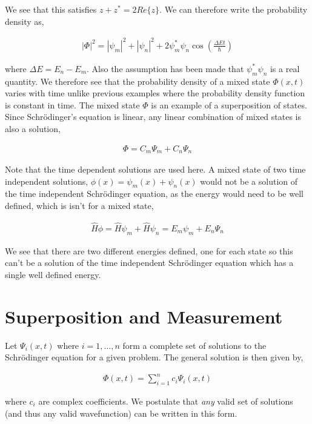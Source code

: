\documentclass[11pt]{amsart}
\begin{document}
We see that this satisfies $z + z^* = 2 Re\{z\}$. We can therefore write the probability density as,

\begin{align*}
  {|\Phi|}^2 = {|\psi_m|}^2 + {|\psi_n|}^2 + 2\psi_m^* \psi_n \cos{\left(\frac{\Delta E t}{\hbar}\right)}
\end{align*}

where $\Delta E = E_n - E_m$. Also the assumption has been made that $\psi_m^*\psi_n$ is a real quantity. We therefore see that the probability density of a mixed state $\Phi(x, t)$ varies with time unlike previous examples where the probability density function is constant in time. The mixed state $\Phi$ is an example of a superposition of states. Since Schr\"{o}dinger's equation is linear, any linear combination of mixed states is also a solution,

\begin{align*}
  \Phi = C_m \Psi_m + C_n \Psi_n
\end{align*}

Note that the time dependent solutions are used here. A mixed state of two time independent solutions, $\phi(x) = \psi_m(x) + \psi_n(x)$ would not be a solution of the time independent Schr\"{o}dinger equation, as the energy would need to be well defined, which is isn't for a mixed state,

\begin{align*}
  \hat{H}\phi = \hat{H}\psi_m + \hat{H}\psi_n = E_m\psi_m + E_n\Psi_n
\end{align*}

We see that there are two different energies defined, one for each state so this can't be a solution of the time independent Schr\"{o}dinger equation which has a single well defined energy.

\section{Superposition and Measurement}

Let $\Psi_i(x, t)$ where $i = 1, \dots, n$ form a complete set of solutions to the Schr\"{o}dinger equation for a given problem. The general solution is then given by,

\begin{align*}
  \Phi(x, t) = \sum\limits_{i=1}^n c_i \Psi_i(x, t)
\end{align*}

where $c_i$ are complex coefficients. We postulate that \textit{any} valid set of solutions (and thus any valid wavefunction) can be written in this form.
\end{document}
